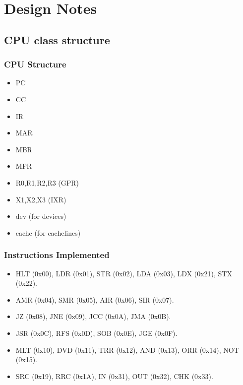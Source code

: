 \documentclass[10pt]{article}
\begin{document}
\section{Design Notes}
\subsection{CPU class structure}
\subsubsection{CPU Structure}
\begin{itemize}
  \item PC
  \item CC
  \item IR
  \item MAR
  \item MBR
  \item MFR
  \item R0,R1,R2,R3 (GPR)
  \item X1,X2,X3 (IXR)
  \item dev (for devices)
  \item cache (for cachelines)
\end{itemize}
\subsubsection{Instructions Implemented}
\begin{itemize}
  \item HLT (0x00), LDR (0x01), STR (0x02), LDA (0x03), LDX (0x21), STX (0x22).
  \item AMR (0x04), SMR (0x05), AIR (0x06), SIR (0x07).
  \item JZ  (0x08), JNE (0x09), JCC (0x0A), JMA (0x0B).
  \item JSR (0x0C), RFS (0x0D), SOB (0x0E), JGE (0x0F).
  \item MLT (0x10), DVD (0x11), TRR (0x12), AND (0x13), ORR (0x14), NOT (0x15).
  \item SRC (0x19), RRC (0x1A), IN  (0x31), OUT (0x32), CHK (0x33).
\end{itemize}
\end{document}
